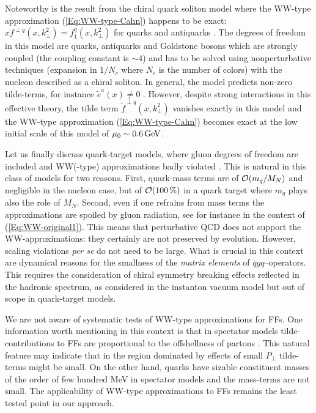 \documentclass[a4paper,11pt]{article}
\def\kperp{k_\perp}
\begin{document}
Noteworthy is the result from the chiral quark soliton
model where the WW-type approximation (\ref{Eq:WW-type-Cahn})
happens to be exact: $xf^{\perp q}(x,\kperp^2)=f_{1}^q(x,\kperp^2)$
for quarks and antiquarks \cite{Lorce:2014hxa}. The degrees of freedom
in this model are quarks, antiquarks and Goldstone bosons which are
strongly coupled (the coupling constant is $\sim 4$) and has to be
solved using nonperturbative techniques (expansion in $1/N_c$ where
$N_c$ is the number of colors) with the nucleon described as a
chiral soliton. In general, the model predicts non-zero tilde-terms, for
instance $\tilde{e}^a(x)\neq 0$
\cite{Schweitzer:2003uy,Ohnishi:2003mf,Cebulla:2007ej}.
However, despite strong interactions in this effective theory, the tilde
term $\tilde{f}^{\perp q}(x,\kperp^2)$ vanishes exactly in this model
\cite{Lorce:2014hxa} and the WW-type approximation (\ref{Eq:WW-type-Cahn})
becomes exact at the low initial scale of this model of
$\mu_0\sim 0.6\,{\rm GeV}$.

Let us finally discuss quark-target models,
where gluon degrees of freedom are included and WW(-type)
approximations badly violated
\cite{Kundu:2001pk,Schlegel:2004rg,Meissner:2007rx,Mukherjee:2009uy}.
This is natural in this class of models for two
reasons. First, quark-mass terms are of ${\cal O}(m_q/M_N)$
and negligible in the nucleon case, but of ${\cal O}(100\,\%)$
in a quark target where $m_q$ plays also the role of $M_N$.
Second, even if one refrains from mass terms the approximations are
spoiled by gluon radiation, see for instance \cite{Harindranath:1997qn}
in the context of (\ref{Eq:WW-original1}).
This means that perturbative QCD does not support the WW-approximations:
they certainly are not preserved by evolution. However, scaling violations
{\it per se} do not need to be large. What is crucial in this context are
dynamical reasons for the smallness of the {\sl matrix elements} of
$\bar{q}gq$--operators. This requires the consideration of chiral symmetry
breaking effects reflected in the hadronic spectrum, as considered in the
instanton vacuum model \cite{Balla:1997hf,Dressler:1999hc} but
out of scope in quark-target models.

We are not aware of systematic tests of WW-type approximations for FFs. One
information worth mentioning in this context is that in spectator models
\cite{Jakob:1997wg} tilde-contributions to FFs are proportional to the
offshellness of partons %
\cite{Lorce:2014hxa,Lorce:2016ugb}. This
natural feature may indicate that in the region dominated by effects of
small $P_\perp$ tilde-terms might be small. On the other hand, quarks have
sizable constituent masses of the order of few hundred MeV in spectator models
and the mass-terms are not small.
The applicability of WW-type approximations to FFs
remains the least tested point in our approach.
\end{document}

